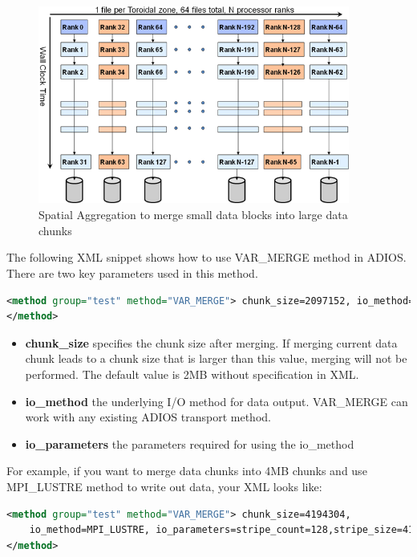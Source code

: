 \begin{figure}[htbp]
\begin{center}
\includegraphics[width=290pt, height=185pt]{figures/mpi-method-serialized-opens.png}
\caption{Spatial Aggregation to merge small data blocks into large data
    chunks}
\label{fig:sar}
\end{center}
\end{figure}


The following XML snippet shows how to use VAR\_MERGE method in ADIOS.
There are two key parameters used in this method.

\begin{lstlisting}[language=XML]
<method group="test" method="VAR_MERGE"> chunk_size=2097152, io_method=MPI_AGGR, io_parameters=num_aggregators=24;num_ost=672
</method>
\end{lstlisting}

\begin{itemize}
\item \textbf{chunk\_size} specifies the chunk size after merging. If
merging current data chunk leads to a chunk size that is larger than this
value, merging will not be performed. The default value is 2MB without  
specification in XML.  

\item \textbf{io\_method} the underlying I/O method for data output.  
VAR\_MERGE can work with any existing ADIOS transport method. 

\item \textbf{io\_parameters} the parameters required for using the io\_method 
\end{itemize}

For example, if you want to merge data chunks into 4MB chunks and use
MPI\_LUSTRE method to write out data, your XML looks like:  

\begin{lstlisting}[language=XML]
<method group="test" method="VAR_MERGE"> chunk_size=4194304,
    io_method=MPI_LUSTRE, io_parameters=stripe_count=128,stripe_size=4194304
</method>
\end{lstlisting}


